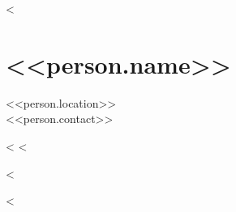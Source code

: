 <%



\section{<<person.name>>}
<<person.location>>\\
<<person.contact>>

<%
<%

\vspace{\baselineskip}
\noindent
\begin{minipage}[t]{0.4\textwidth}
<%
\end{minipage}
\noindent
\begin{minipage}[t]{0.6\textwidth}
<%
\end{minipage}

